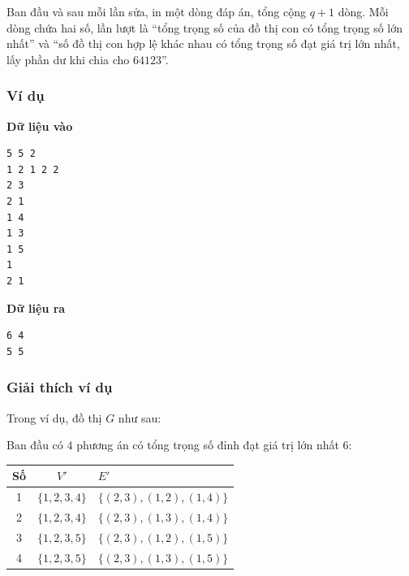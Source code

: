 \documentclass[11pt]{article}
\begin{document}
Ban đầu và sau mỗi lần sửa, in một dòng đáp án, tổng cộng \(q+1\) dòng. Mỗi
dòng chứa hai số, lần lượt là ``tổng trọng số của đồ thị con có tổng trọng số
lớn nhất'' và ``số đồ thị con hợp lệ khác nhau có tổng trọng số đạt giá trị
lớn nhất, lấy phần dư khi chia cho \(64123\)''.

\subsubsection{Ví dụ}

\begin{center}
\begin{minipage}{0.36\linewidth}
\textbf{Dữ liệu vào}
\begin{verbatim}
5 5 2
1 2 1 2 2
2 3
2 1
1 4
1 3
1 5
1
2 1
\end{verbatim}
\end{minipage}
\hfill
\begin{minipage}{0.36\linewidth}
\textbf{Dữ liệu ra}
\begin{verbatim}
6 4
5 5
\end{verbatim}
\end{minipage}
\end{center}

\subsubsection{Giải thích ví dụ}

Trong ví dụ, đồ thị \(G\) như sau:

\begin{center}
\end{center}

Ban đầu có \(4\) phương án có tổng trọng số đỉnh đạt giá trị lớn nhất \(6\):

\begin{center}
\small
\begin{tabular}{c c l}
\textbf{Số} & \(V'\) & \(E'\)\\
\hline
1 & \(\{1,2,3,4\}\) & \(\{(2,3),(1,2),(1,4)\}\)\\
2 & \(\{1,2,3,4\}\) & \(\{(2,3),(1,3),(1,4)\}\)\\
3 & \(\{1,2,3,5\}\) & \(\{(2,3),(1,2),(1,5)\}\)\\
4 & \(\{1,2,3,5\}\) & \(\{(2,3),(1,3),(1,5)\}\)
\end{tabular}
\end{center}
\end{document}
